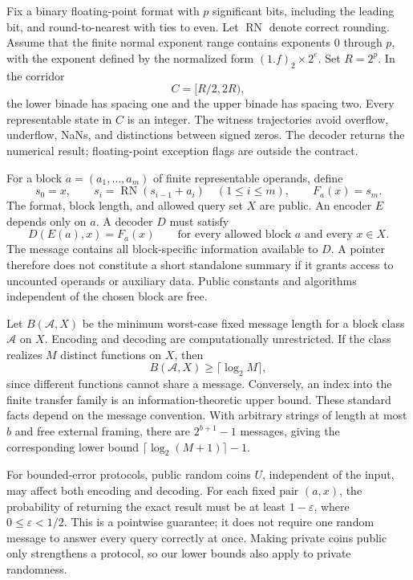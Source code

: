 \documentclass[11pt,reqno]{amsart}
\theoremstyle{definition}
\theoremstyle{remark}
\numberwithin{equation}{section}
\DeclareMathOperator{\RN}{RN}
\begin{document}
Fix a binary floating-point format with $p$ significant bits, including the
leading bit, and round-to-nearest with ties to even. Let $\RN$ denote correct
rounding. Assume that the finite normal exponent range contains exponents
$0$ through $p$, with the exponent defined by the normalized form
$(1.f)_2\times2^e$. Set $R=2^p$. In the corridor
\[
 C=[R/2,2R),
\]
the lower binade has spacing one and the upper binade has spacing two.
Every representable state in $C$ is an integer. The witness trajectories avoid
overflow, underflow, NaNs, and distinctions between signed zeros. The decoder
returns the numerical result; floating-point exception flags are outside the
contract.

For a block $a=(a_1,\ldots,a_m)$ of finite representable operands, define
\begin{equation}\label{eq:fold}
 s_0=x,\qquad s_i=\RN(s_{i-1}+a_i)\quad(1\le i\le m),\qquad F_a(x)=s_m.
\end{equation}
The format, block length, and allowed query set $X$ are public. An encoder
$E$ depends only on $a$. A decoder $D$ must satisfy
\begin{equation}\label{eq:contract}
 D(E(a),x)=F_a(x)
 \qquad\text{for every allowed block $a$ and every $x\in X$.}
\end{equation}
The message contains all block-specific information available to $D$. A
pointer therefore does not constitute a short standalone summary if it grants
access to uncounted operands or auxiliary data. Public constants and
algorithms independent of the chosen block are free.

Let $B(\mathcal{A},X)$ be the minimum worst-case fixed message length for a
block class $\mathcal{A}$ on $X$. Encoding and decoding are computationally
unrestricted. If the class realizes $M$ distinct functions on $X$, then
\begin{equation}\label{eq:counting}
 B(\mathcal{A},X)\ge \lceil\log_2 M\rceil,
\end{equation}
since different functions cannot share a message. Conversely, an index into
the finite transfer family is an information-theoretic upper bound. These
standard facts depend on the message convention. With arbitrary strings of
length at most $b$ and free external framing, there are $2^{b+1}-1$ messages,
giving the corresponding lower bound $\lceil\log_2(M+1)\rceil-1$.

For bounded-error protocols, public random coins $U$, independent of the
input, may affect both encoding and decoding. For each fixed pair $(a,x)$,
the probability of returning the exact result must be at least $1-\varepsilon$,
where $0\le\varepsilon<1/2$. This is a pointwise guarantee; it does not require
one random message to answer every query correctly at once. Making private
coins public only strengthens a protocol, so our lower bounds also apply to
private randomness.
\end{document}
